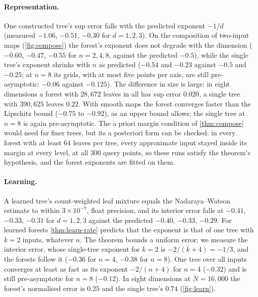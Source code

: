 \paragraph{Representation.}
One constructed tree's sup error falls with the predicted exponent $-1/d$
(measured $-1.06$, $-0.51$, $-0.30$ for $d=1,2,3$).  On the composition of two-input maps
(\cref{fig:compose}) the forest's exponent does not degrade with the dimension ($-0.60$,
$-0.47$, $-0.55$ for $n=2,4,8$, against the predicted $-0.5$), while the single tree's exponent shrinks with $n$ as
predicted ($-0.54$ and $-0.23$ against $-0.5$ and $-0.25$; at $n=8$ its grids, with at most five
points per axis, are still pre-asymptotic: $-0.06$ against $-0.125$).  The difference in size
is large: in eight dimensions a forest with $28{,}672$ leaves in all has sup error $0.020$, a
single tree with $390{,}625$ leaves $0.22$.  With smooth maps the forest converges faster than the Lipschitz bound ($-0.75$ to
$-0.92$), as an upper bound allows; the single tree at $n=8$ is again pre-asymptotic.
The a priori margin condition of \cref{thm:compose} would need far finer trees, but its a
posteriori form can be checked: in every forest with at least $64$ leaves per tree, every
approximate input stayed inside its margin at every level, at all 300 query points, so these runs satisfy the
theorem's hypothesis, and the forest exponents are fitted on them.

\paragraph{Learning.}
A learned tree's count-weighted leaf mixture equals the Nadaraya--Watson
estimate to within $3\times10^{-7}$, float precision, and its interior error falls at $-0.41$,
$-0.33$, $-0.31$ for $d=1,2,3$ against the predicted $-0.40$, $-0.33$, $-0.29$.  For learned
forests \cref{thm:learn-rate} predicts that the exponent is that of one tree with $k=2$ inputs,
whatever $n$.  The theorem bounds a uniform error; we measure the interior error, whose
single-tree exponent for $k=2$ is $-2/(k+4)=-1/3$, and the forests follow it ($-0.36$ for
$n=4$, $-0.38$ for $n=8$).  One tree
over all inputs converges at least as fast as its exponent $-2/(n+4)$ for $n=4$ ($-0.32$) and
is still pre-asymptotic for $n=8$ ($-0.12$).  In eight dimensions at $N=16{,}000$ the forest's
normalised error is $0.25$ and the single tree's $0.74$ (\cref{fig:learn}).

